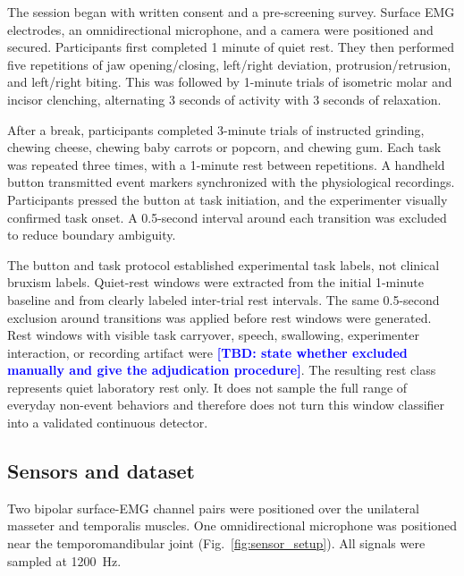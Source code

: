\documentclass[pdflatex,sn-nature,iicol]{sn-jnl}
\newcommand{\TBD}[1]{\textcolor{blue}{\textbf{[TBD: #1]}}}
\begin{document}
\color{blue}
The session began with written consent and a pre-screening survey. Surface EMG electrodes, an omnidirectional microphone, and a camera were positioned and secured. Participants first completed 1 minute of quiet rest. They then performed five repetitions of jaw opening/closing, left/right deviation, protrusion/retrusion, and left/right biting. This was followed by 1-minute trials of isometric molar and incisor clenching, alternating 3 seconds of activity with 3 seconds of relaxation.
\color{black}

\color{blue}
After a break, participants completed 3-minute trials of instructed grinding, chewing cheese, chewing baby carrots or popcorn, and chewing gum. Each task was repeated three times, with a 1-minute rest between repetitions. A handheld button transmitted event markers synchronized with the physiological recordings. Participants pressed the button at task initiation, and the experimenter visually confirmed task onset. A 0.5-second interval around each transition was excluded to reduce boundary ambiguity.
\color{black}

\color{blue}
The button and task protocol established experimental task labels, not clinical bruxism labels. Quiet-rest windows were extracted from the initial 1-minute baseline and from clearly labeled inter-trial rest intervals. The same 0.5-second exclusion around transitions was applied before rest windows were generated. Rest windows with visible task carryover, speech, swallowing, experimenter interaction, or recording artifact were \TBD{state whether excluded manually and give the adjudication procedure}. The resulting rest class represents quiet laboratory rest only. It does not sample the full range of everyday non-event behaviors and therefore does not turn this window classifier into a validated continuous detector.

\subsection{Sensors and dataset}

Two bipolar surface-EMG channel pairs were positioned over the unilateral masseter and temporalis muscles. One omnidirectional microphone was positioned near the temporomandibular joint (Fig.~\ref{fig:sensor_setup}). All signals were sampled at 1200~Hz.

\end{document}
